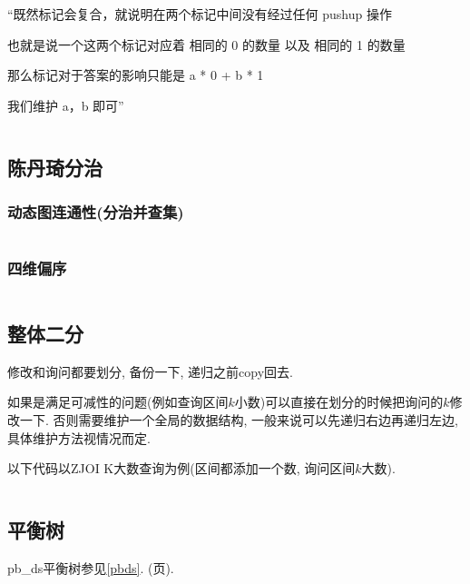 \documentclass[a4paper, twoside]{article}
\begin{document}
\begin{multicols}{2}
					``既然标记会复合，就说明在两个标记中间没有经过任何 pushup 操作

					也就是说一个这两个标记对应着 相同的 0 的数量 以及 相同的 1 的数量

					那么标记对于答案的影响只能是 a * 0 + b * 1

					我们维护 a，b 即可''

					\inputminted{cpp}{../src/datastructure/ec20g.cpp}

					
	
			\subsection{陈丹琦分治}
				\subsubsection{动态图连通性(分治并查集)}
					\inputminted{cpp}{../src/datastructure/分治并查集.cpp}

				\subsubsection{四维偏序}
					\inputminted{cpp}{../src/datastructure/CDQ分治.cpp}
	
			\subsection{整体二分}
				修改和询问都要划分, 备份一下, 递归之前copy回去.

				如果是满足可减性的问题(例如查询区间$k$小数)可以直接在划分的时候把询问的$k$修改一下. 否则需要维护一个全局的数据结构, 一般来说可以先递归右边再递归左边, 具体维护方法视情况而定.

				以下代码以ZJOI K大数查询为例(区间都添加一个数, 询问区间$k$大数).

				\inputminted{cpp}{../src/datastructure/整体二分.cpp}

	
	
			\subsection{平衡树}
				pb\_ds平衡树参见\ref{pbds}. (\pageref{pbds}页).


\end{multicols}
\end{document}
